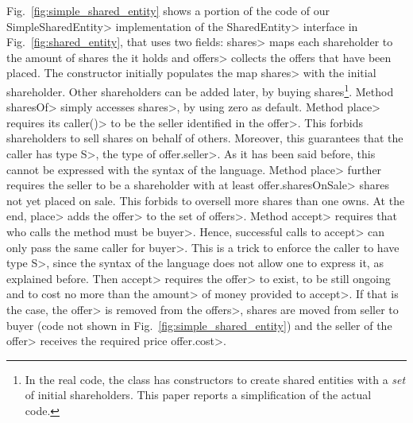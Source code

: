 Fig.~\ref{fig:simple_shared_entity} shows a portion of the code of our \<SimpleSharedEntity>
implementation of the \<SharedEntity> interface in Fig.~\ref{fig:shared_entity}, that
uses two fields: \<shares> maps each shareholder to the amount of shares the it holds and
\<offers> collects the offers that have been placed.
The constructor initially populates the map \<shares> with the initial shareholder.
Other shareholders can be added later, by buying shares\footnote{In the real code, the class has
  constructors to create shared entities with a \emph{set} of initial shareholders. This paper
  reports a simplification of the actual code.}.
Method \<sharesOf> simply accesses
\<shares>, by using zero as default. Method \<place> requires its \<caller()> to be
the seller identified in the \<offer>. This forbids shareholders to sell shares on behalf of others.
Moreover, this guarantees that the caller has type \<S>, the type of \<offer.seller>.
As it has been said before, this cannot be expressed with the syntax of the language.
Method \<place> further requires the seller to be a shareholder with at least \<offer.sharesOnSale>
shares not yet placed on sale. This forbids to oversell more shares
than one owns. At the end, \<place> adds the \<offer> to the set of \<offers>.
Method \<accept> requires that who calls the method must be \<buyer>. Hence, successful
calls to \<accept> can only pass the same caller for \<buyer>. This is a trick to enforce the
caller to have type \<S>, since the syntax of the language does not allow one to express it,
as explained before. Then \<accept> requires the \<offer> to exist, to be still ongoing
and to cost no more than the \<amount> of money provided to \<accept>. If that is the case,
the \<offer> is removed from the \<offers>, shares are moved from seller to buyer (code not
shown in Fig.~\ref{fig:simple_shared_entity}) and the seller of the \<offer>
receives the required price \<offer.cost>.

